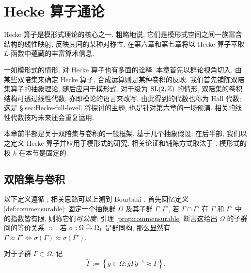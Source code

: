 
\chapter{Hecke 算子通论}
Hecke 算子是模形式理论的核心之一. 粗略地说, 它们是模形式空间之间一族富含结构的线性映射, 反映其间的某种对称性. 在第六章和第七章将以 Hecke 算子萃取 $L$-函数中蕴藏的丰富算术信息.

一如模形式的情形, 对 Hecke 算子也有多面的诠释. 本章首先以群论视角切入, 由某些双陪集来确定 Hecke 算子, 合成运算则是某种卷积的反映. 我们首先铺陈双陪集算子的抽象理论, 随后应用于模形式. 对于级为 $\operatorname{SL}(2,\mathbb{Z})$ 的情形, 双陪集的卷积结构可透过线性代数, 亦即模论的语言来改写, 由此得到的代数也称为 Hall 代数; 这是 \S\ref{sec:Hecke-full-level} 将探讨的主题, 也是针对第六章的一场预演. 相关的线性代数技巧未来还会重复运用.

本章前半部是关于双陪集与卷积的一般框架, 基于几个抽象假设; 在后半部, 我们以之定义 Hecke 算子并应用于模形式的研究. 相关论证和铺陈方式取法于 \cite{DS05,Mi89}. 模形式的权 $k$ 在本节是固定的.

\section{双陪集与卷积}\label{sec:convolutions}
以下定义遵循 \cite[\S 2.7]{Mi89}; 相关思路可以上溯到 Bourbaki \cite[VI, \S 2, ex 22]{Bou68}. 首先回忆定义 \ref{def:commensurable}: 固定一个抽象群 $\Omega$ 及其子群 $\Gamma, \Gamma'$, 若 $\Gamma \cap \Gamma'$ 在 $\Gamma$ 和 $\Gamma'$ 中的指数皆有限, 则称它们\emph{可公度}; 引理 \ref{prop:commensurable} 断言这给出 $\Omega$ 的子群间的等价关系 $\approx$. 若 $\sigma: \Omega \stackrel{\sim}{\rightarrow} \Omega_1$ 是群同构, 那么显然有 $\Gamma \approx \Gamma' \iff \sigma(\Gamma) \approx \sigma(\Gamma')$. 

\begin{convention}\label{conv:Gamma-tilde} 
	对于子群 $\Gamma \subset \Omega$, 记
	\[ \widetilde{\Gamma} := \left\{g \in \Omega: g\Gamma g^{-1} \approx \Gamma \right\}. \]
\end{convention}

